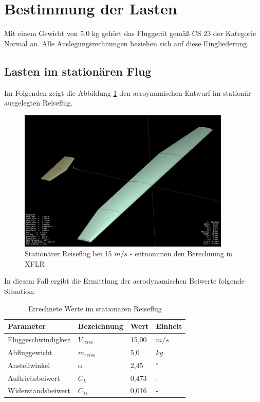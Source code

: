 \clearpage


\section{Bestimmung der Lasten}
Mit einem Gewicht von 5,0 kg gehört das Fluggerät gemäß CS 23 der Kategorie \glqq Normal\grqq{} an.
Alle Auslegungsrechnungen beziehen sich auf diese Eingliederung.


\subsection{Lasten im stationären Flug}
Im Folgenden zeigt die Abbildung \ref{fig:Stationärer Reiseflug in XFLR} den aeroynamischen Entwurf im stationär ausgelegten Reiseflug.

\begin{figure}[H]
\centering
\includegraphics[width=0.9\textwidth]{bilder/Fotos/Aeroentwurf_Fluegelkonstruktion.png}
\caption{Stationärer Reiseflug bei 15 $m/s$ - entnommen den Berechnung in XFLR} 
\label{fig:Stationärer Reiseflug in XFLR}
\end{figure}

In diesem Fall ergibt die Ermittlung der aerodynamischen Beiwerte folgende Situation:

\begin{table}[h]
\centering
\begin{tabular}{|l|l|l|l|}
\hline
Parameter  & Bezeichnung &  Wert & Einheit \\ \hline
Fluggeschwindigkeit  & $V_{reise}$ & 15,00 & $m/s$\\ \hline
Abfluggewicht & $m_{reise}$  & 5,0 & $kg$\\ \hline
Anstellwinkel & $\alpha$ & 2,45 & $^\circ$ \\ \hline
Auftriebsbeiwert & $C_{L}$ & 0,473 & -\\ \hline
Widerstandsbeiwert & $C_{D}$ & 0,016  & -  \\ \hline
\end{tabular}
\caption{Errechnete Werte im stationären Reiseflug}
\label{tab:Errechnete Werte im Stationären Reiseflug}
\end{table}

